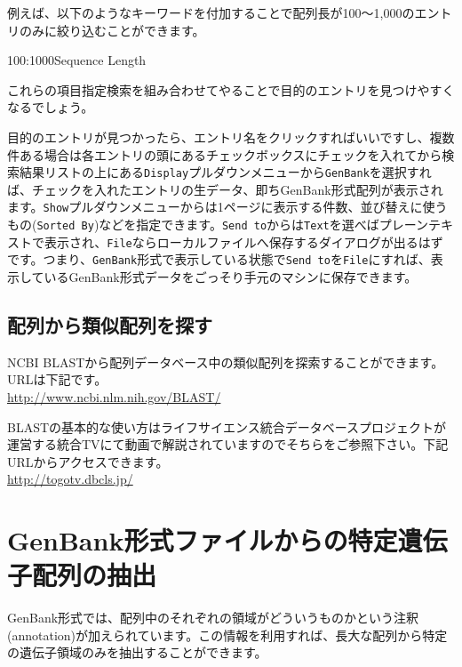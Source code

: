 \documentclass[titlepage,10pt,a4paper]{jsbook}
\newenvironment{pre}{\begin{leftbar}\raggedright\ttfamily\footnotesize\setlength{\baselineskip}{1.4em}}{\end{leftbar}\vspace{-1em}}
\begin{document}
例えば、以下のようなキーワードを付加することで配列長が100～1,000のエントリのみに絞り込むことができます。
\begin{pre}
100:1000{\lbrack}Sequence Length{\rbrack}
\end{pre}
これらの項目指定検索を組み合わせてやることで目的のエントリを見つけやすくなるでしょう。

目的のエントリが見つかったら、エントリ名をクリックすればいいですし、複数件ある場合は各エントリの頭にあるチェックボックスにチェックを入れてから検索結果リストの上にある\texttt{Display}プルダウンメニューから\texttt{GenBank}を選択すれば、チェックを入れたエントリの生データ、即ちGenBank形式配列が表示されます。\texttt{Show}プルダウンメニューからは1ページに表示する件数、並び替えに使うもの(\texttt{Sorted By})などを指定できます。\texttt{Send to}からは\texttt{Text}を選べばプレーンテキストで表示され、\texttt{File}ならローカルファイルへ保存するダイアログが出るはずです。つまり、\texttt{GenBank}形式で表示している状態で\texttt{Send to}を\texttt{File}にすれば、表示しているGenBank形式データをごっそり手元のマシンに保存できます。

\subsection{配列から類似配列を探す}

NCBI BLASTから配列データベース中の類似配列を探索することができます。URLは下記です。\\
\href{http://www.ncbi.nlm.nih.gov/BLAST/}{http://www.ncbi.nlm.nih.gov/BLAST/}

BLASTの基本的な使い方はライフサイエンス統合データベースプロジェクトが運営する統合TVにて動画で解説されていますのでそちらをご参照下さい。下記URLからアクセスできます。\\
\href{http://togotv.dbcls.jp/}{http://togotv.dbcls.jp/}

\section{GenBank形式ファイルからの特定遺伝子配列の抽出}

GenBank形式では、配列中のそれぞれの領域がどういうものかという注釈(annotation)が加えられています。この情報を利用すれば、長大な配列から特定の遺伝子領域のみを抽出することができます。
\end{document}
